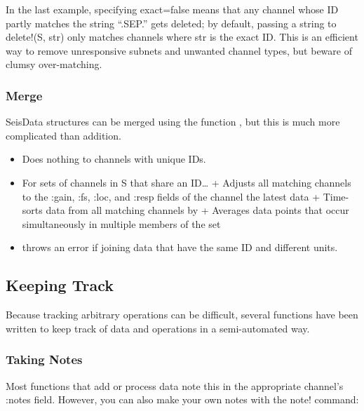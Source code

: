 \documentclass[letterpaper,11pt,english]{sphinxmanual}
\begin{document}
In the last example, specifying exact=false means that any channel whose ID
partly matches the string “.SEP.” gets deleted; by default, passing
a string to delete!(S, str) only matches channels where str is the exact ID.
This is an efficient way to remove unresponsive subnets and unwanted channel
types, but beware of clumsy over-matching.


\subsubsection{Merge}
\label{\detokenize{src/working_with_data:merge}}
SeisData structures can be merged using the function , but this is
much more complicated than addition.


\begin{fulllineitems}
\end{fulllineitems}

\begin{itemize}
\item {} 
Does nothing to channels with unique IDs.

\item {} 
For sets of channels in S that share an ID…
+ Adjusts all matching channels to the :gain, :fs, :loc, and :resp fields of the channel the latest data
+ Time-sorts data from all matching channels by 
+ Averages data points that occur simultaneously in multiple members of the set

\item {} 
throws an error if joining data that have the same ID and different units.

\end{itemize}


\subsection{Keeping Track}
\label{\detokenize{src/working_with_data:keeping-track}}
Because tracking arbitrary operations can be difficult, several functions have
been written to keep track of data and operations in a semi-automated way.


\subsubsection{Taking Notes}
\label{\detokenize{src/working_with_data:taking-notes}}
Most functions that add or process data note this in the appropriate channel’s :notes field.
However, you can also make your own notes with the note! command:
\end{document}
